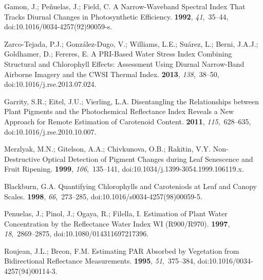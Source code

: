 \documentclass[remotesensing,article,accept,moreauthors,pdftex]{Definitions/mdpi}
\begin{document}
\begin{thebibliography}{999}
Gamon, J.; Pe{\~n}uelas, J.; Field, C.
\newblock A Narrow-Waveband Spectral Index That Tracks Diurnal Changes in
  Photosynthetic Efficiency.
 {\bf 1992}, {\em 41},~35--44, doi:10.1016/0034-4257(92)90059-s.

{Zarco-Tejada}, P.J.; {Gonz{\'a}lez-Dugo}, V.; Williams, L.E.; Su{\'a}rez, L.;
  Berni, J.A.J.; Goldhamer, D.; Fereres, E.
\newblock A {{PRI}}-Based Water Stress Index Combining Structural and
  Chlorophyll Effects: Assessment Using Diurnal Narrow-Band Airborne Imagery
  and the {{CWSI}} Thermal Index.
 {\bf 2013}, {\em 138},~38--50, doi:10.1016/j.rse.2013.07.024.

Garrity, S.R.; Eitel, J.U.; Vierling, L.A.
\newblock Disentangling the Relationships between Plant Pigments and the
  Photochemical Reflectance Index Reveals a New Approach for Remote Estimation
  of Carotenoid Content.
 {\bf 2011}, {\em 115},~628--635, doi:10.1016/j.rse.2010.10.007.

Merzlyak, M.N.; Gitelson, A.A.; Chivkunova, O.B.; Rakitin, V.Y.
\newblock Non-Destructive Optical Detection of Pigment Changes during Leaf
  Senescence and Fruit Ripening.
 {\bf 1999}, {\em 106},~135--141, doi:10.1034/j.1399-3054.1999.106119.x.

Blackburn, G.A.
\newblock Quantifying Chlorophylls and Caroteniods at Leaf and Canopy Scales.
 {\bf 1998}, {\em 66},~273--285, doi:10.1016/s0034-4257(98)00059-5.

Penuelas, J.; Pinol, J.; Ogaya, R.; Filella, I.
\newblock Estimation of Plant Water Concentration by the Reflectance {{Water
  Index WI}} ({{R900}}/{{R970}}).
 {\bf 1997}, {\em
  18},~2869--2875, doi:10.1080/014311697217396.

Roujean, J.L.; Breon, F.M.
\newblock Estimating {{PAR}} Absorbed by Vegetation from Bidirectional
  Reflectance Measurements.
 {\bf 1995}, {\em 51},~375--384, doi:10.1016/0034-4257(94)00114-3.


\end{thebibliography}
\end{document}
